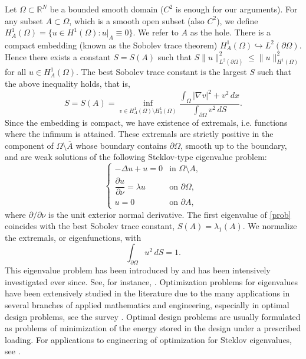 \documentclass[11pt]{amsart}
\theoremstyle{remark}
\numberwithin{equation}{section}
\newcommand{\R}{\mathbb{R}}
\begin{document}
Let $\Omega\subset\R^N$ be a bounded smooth domain ($C^2$ is enough for our arguments). For any subset $A\subset\Omega$, which is a smooth open subset (also $C^2$), we define $H^1_A(\Omega)=\{u\in H^1(\Omega):u|_A\equiv0\}$. We refer to $A$ as the hole. There is a compact embedding (known as the Sobolev trace theorem) $H^1_A(\Omega)\hookrightarrow L^2(\partial\Omega)$. Hence there exists a constant $S=S(A)$ such that $S\|u\|^2_{L^2(\partial\Omega)}\le\|u\|^2_{H^1(\Omega)}$ for all $u\in H^1_A(\Omega)$. The best Sobolev trace constant is the largest $S$ such that the above inequality holds, that is,
\[
S=S(A)=\inf_{v\in H^1_A(\Omega)\setminus H^1_0(\Omega)}\frac{\int_\Omega|\nabla v|^2+v^2\,dx}{\int_{\partial\Omega}v^2\,dS}.
\]
Since the embedding is compact, we have existence of extremals, i.e. functions where the infimum is attained. These extremals are strictly positive in the component of $\Omega\setminus\overline A$ whose boundary contains $\partial\Omega$, smooth up to the boundary, and are weak solutions of the following Steklov-type eigenvalue problem:
\begin{equation}\label{prob}
\begin{cases}
-\Delta u+u=0 & \text{in }\Omega\setminus A,\\[2pt]
\dfrac{\partial u}{\partial\nu}=\lambda u & \text{on }\partial\Omega,\\[4pt]
u=0 & \text{on }\partial A,
\end{cases}
\end{equation}
where $\partial/\partial\nu$ is the unit exterior normal derivative. The first eigenvalue of \eqref{prob} coincides with the best Sobolev trace constant, $S(A)=\lambda_1(A)$. We normalize the extremals, or eigenfunctions, with
\begin{equation}\label{norm}
\int_{\partial\Omega}u^2\,dS=1.
\end{equation}
This eigenvalue problem has been introduced by \cite{St} and has been intensively investigated ever since. See, for instance, \cite{CC,FBRW1,MR}. Optimization problems for eigenvalues have been extensively studied in the literature due to the many applications in several branches of applied mathematics and engineering, especially in optimal design problems, see the survey \cite{He}. Optimal design problems are usually formulated as problems of minimization of the energy stored in the design under a prescribed loading. For applications to engineering of optimization for Steklov eigenvalues, see \cite{CC}.
\end{document}
